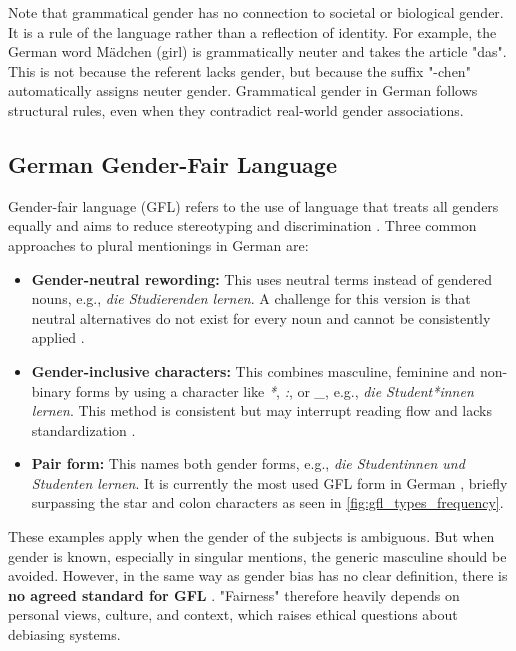         Note that grammatical gender has no connection to societal or biological gender. It is a rule of the language rather than a reflection of identity. For example, the German word Mädchen (girl) is grammatically neuter and takes the article "das". This is not because the referent lacks gender, but because the suffix "-chen" automatically assigns neuter gender. Grammatical gender in German follows structural rules, even when they contradict real-world gender associations.

    \subsection{German Gender-Fair Language} \label{subsection:german_gfl}
    Gender-fair language (GFL) refers to the use of language that treats all genders equally and aims to reduce stereotyping and discrimination \citep{sczesnyCanGenderFairLanguage2016}. Three common approaches to plural mentionings in German are: 

    \begin{itemize}
        \item \textbf{Gender-neutral rewording:}  
        This uses neutral terms instead of gendered nouns, e.g., \textit{die Studierenden lernen}. A challenge for this version is that neutral alternatives do not exist for every noun and cannot be consistently applied \citep{lardelliBuildingBridgesDataset2024}.

        \item \textbf{Gender-inclusive characters:}  
        This combines masculine, feminine and non-binary forms by using a character like \textit{*}, \textit{:}, or \textit{\_}, e.g., \textit{die Student*innen lernen}. This method is consistent but may interrupt reading flow and lacks standardization \citep{lardelliBuildingBridgesDataset2024}.

        \item \textbf{Pair form:}  
        This names both gender forms, e.g., \textit{die Studentinnen und Studenten lernen}. It is currently the most used GFL form in German \citep{waldendorfWordsChangeIncrease2024}, briefly surpassing the star and colon characters as seen in \autoref{fig:gfl_types_frequency}.
    \end{itemize}

    These examples apply when the gender of the subjects is ambiguous. But when gender is known, especially in singular mentions, the generic masculine should be avoided. However, in the same way as gender bias has no clear definition, there is \textbf{no agreed standard for GFL} \citep{lardelliBuildingBridgesDataset2024, savoldiDecadeGenderBias2025}. "Fairness" therefore heavily depends on personal views, culture, and context, which raises ethical questions about debiasing systems.

